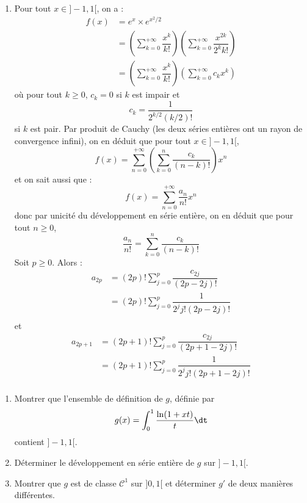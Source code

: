 \documentclass[a4paper,10pt]{report}
\begin{document}
\begin{enumerate}
\item Pour tout $x \in ]-1,1[$, on a :
\begin{align*}
f(x) & = e^x \times e^{x^2/2} \\
& = \left( \sum_{k=0}^{+ \infty} \dfrac{x^k}{k!} \right) \left( \sum_{k=0}^{+ \infty} \dfrac{x^{2k}}{2^k k!} \right)  \\
& = \left( \sum_{k=0}^{+ \infty} \dfrac{x^k}{k!} \right) \left( \sum_{k=0}^{+ \infty} c_k x^k \right)  
\end{align*}
où pour tout $k \geq 0$, $c_k=0$ si $k$ est impair et 
$$ c_k = \dfrac{1}{2^{k/2} (k/2)!}$$
si $k$ est pair. Par produit de Cauchy (les deux séries entières ont un rayon de convergence infini), on en déduit que pour tout $x \in ]-1,1[$,
$$ f(x) = \sum_{n=0}^{+ \infty} \left(\sum_{k=0}^n \dfrac{c_k}{(n-k)!} \right) x^n$$
et on sait aussi que :
$$ f(x) = \sum_{n=0}^{+ \infty} \dfrac{a_n}{n!} x^n$$
donc par unicité du développement en série entière, on en déduit que pour tout $n \geq 0$,
$$\dfrac{a_n}{n!} = \sum_{k=0}^n \dfrac{c_k}{(n-k)!}$$
Soit $p \geq 0$. Alors :
\begin{align*}
a_{2p} & = (2p)! \sum_{j=0}^p \dfrac{c_{2j}}{(2p-2j)!} \\
& = (2p)! \sum_{j=0}^p \dfrac{1}{2^j j! (2p-2j)!} \\
\end{align*}
et 
\begin{align*}
a_{2p+1} & = (2p+1)! \sum_{j=0}^p \dfrac{c_{2j}}{(2p+1-2j)!} \\
& = (2p+1)! \sum_{j=0}^p \dfrac{1}{2^j j! (2p+1-2j)!} \\
\end{align*}
\end{enumerate}


\begin{Exercice}{} \begin{enumerate}
\item Montrer que l'ensemble de définition de $g$, définie par 
$$ g(x) = \int_{0}^1 \dfrac{\ln(1+xt)}{t} \dt$$
contient $]-1,1[$.
\item Déterminer le développement en série entière de $g$ sur $]-1,1[$.
\item Montrer que $g$ est de classe $\mathcal{C}^1$ sur $]0,1[$ et déterminer $g'$ de deux manières différentes.
\end{enumerate}
\end{Exercice}
\end{document}
